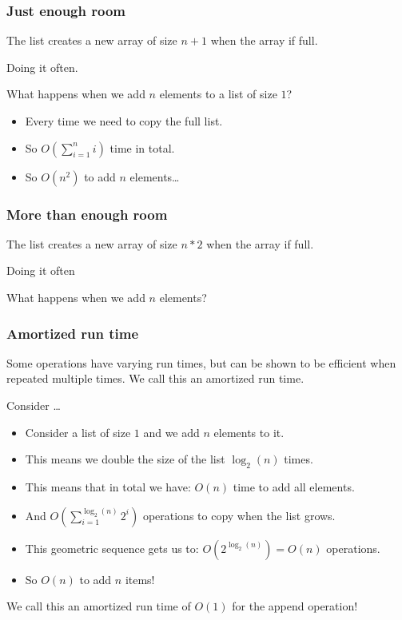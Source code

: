 \begin{frame}
	\frametitle{Just enough room}
		The list creates a new array of size $n+1$ when the array if full.
		
		Doing it often.
	
		What happens when we add $n$ elements to a list of size $1$?
		
		\begin{itemize}
			\item Every time we need to copy the full list.
			\item So $O(\sum\limits_{i=1}^{n}i)$ time in total.
			\item So $O(n^2)$ to add $n$ elements\dots
		\end{itemize}
\end{frame}

\begin{frame}
	\frametitle{More than enough room}
		The list creates a new array of size $n*2$ when the array if full.
		
		Doing it often
	
		What happens when we add $n$ elements?
\end{frame}

\begin{frame}
	\frametitle{Amortized run time}
		Some operations have varying run times, but can be shown to be efficient when repeated multiple times. We call
		this an amortized run time.
	
Consider \ldots
		\begin{itemize}
			\item Consider a list of size $1$ and we add $n$ elements to it.
			\item This means we double the size of the list $\log_2(n)$ times.
			\item This means that in total we have: $O(n)$ time to add all elements.
			\item And $O\left(\sum\limits_{i=1}^{\log_2(n)} 2^i\right)$ operations to copy when the list grows.
			\item This geometric sequence gets us to: $O(2^{\log_2(n)}) = O(n)$ operations.
			\item So $O(n)$ to add $n$ items!
		\end{itemize}
		
		We call this an amortized run time of $O(1)$ for the append operation!
\end{frame}

